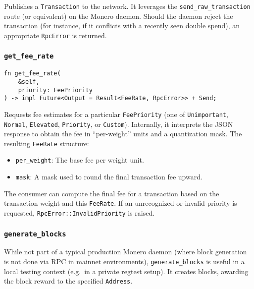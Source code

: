 Publishes a \texttt{Transaction} to the network.  It leverages the
\texttt{send\_raw\_transaction} route (or equivalent) on the Monero daemon.  
Should the daemon reject the transaction (for instance, if it conflicts with a
recently seen double spend), an appropriate \texttt{RpcError} is returned.

\subsubsection{\texttt{get\_fee\_rate}}
\label{sec:monero-rpc-rpc-trait-fee-estimate}

\begin{verbatim}
fn get_fee_rate(
    &self,
    priority: FeePriority
) -> impl Future<Output = Result<FeeRate, RpcError>> + Send;
\end{verbatim}

Requests fee estimates for a particular \texttt{FeePriority} (one of
\texttt{Unimportant}, \texttt{Normal}, \texttt{Elevated}, \texttt{Priority}, or
\texttt{Custom}).  Internally, it interprets the JSON response to obtain the fee
in “per-weight” units and a quantization mask.  The resulting \texttt{FeeRate}
structure:

\begin{itemize}
    \item \texttt{per\_weight}: The base fee per weight unit.
    \item \texttt{mask}: A mask used to round the final transaction fee upward.
\end{itemize}

The consumer can compute the final fee for a transaction based on the
transaction weight and this \texttt{FeeRate}.  If an unrecognized or invalid
priority is requested, \texttt{RpcError::InvalidPriority} is raised.

\subsubsection{\texttt{generate\_blocks}}
\label{sec:monero-rpc-rpc-trait-generate-blocks}

While not part of a typical production Monero daemon (where block generation is
not done via RPC in mainnet environments), \texttt{generate\_blocks} is useful
in a local testing context (e.g.\ in a private regtest setup).  It creates
blocks, awarding the block reward to the specified \texttt{Address}.

